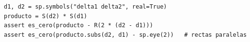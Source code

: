 %
\begin{lstlisting}
d1, d2 = sp.symbols("delta1 delta2", real=True)
producto = S(d2) * S(d1)
assert es_cero(producto - R(2 * (d2 - d1)))
assert es_cero(producto.subs(d2, d1) - sp.eye(2))   # rectas paralelas
\end{lstlisting}
\comprobacionPie
